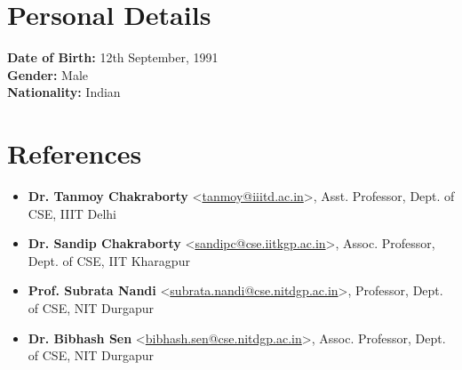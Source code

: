 \documentclass[margin, centered]{res}
\begin{document}
\begin{resume}

\section{Personal Details}
\textbf{Date of Birth:} 12th September, 1991 \\
\textbf{Gender:} Male \\ 
\textbf{Nationality:} Indian

\section{References}
\begin{itemize}[leftmargin=*]
\item[] \textbf{Dr. Tanmoy Chakraborty} \textless \href{mailto:tanmoy@iiitd.ac.in}{tanmoy@iiitd.ac.in}\textgreater, Asst. Professor, Dept. of CSE, IIIT Delhi
\item[] \textbf{Dr. Sandip Chakraborty} \textless \href{mailto:sandipc@cse.iitkgp.ac.in}{sandipc@cse.iitkgp.ac.in}\textgreater, Assoc. Professor, Dept. of CSE, IIT Kharagpur
\item[] \textbf{Prof. Subrata Nandi} \textless \href{mailto:subrata.nandi@cse.nitdgp.ac.in}{subrata.nandi@cse.nitdgp.ac.in}\textgreater, Professor, Dept. of CSE, NIT Durgapur
\item[] \textbf{Dr. Bibhash Sen} \textless \href{mailto:bibhash.sen@cse.nitdgp.ac.in}{bibhash.sen@cse.nitdgp.ac.in}\textgreater, Assoc. Professor, Dept. of CSE, NIT Durgapur

\end{itemize}


\end{resume}
\end{document}
